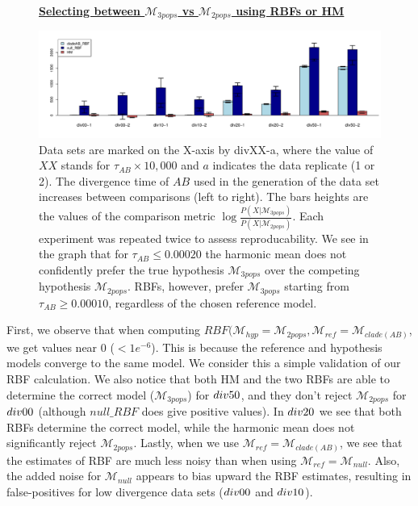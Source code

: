 \documentclass[11pt]{article}
\newcommand{\M}{\mathcal{M}}
\newcommand{\Mref}{\M_{ref}}
\newcommand{\Mhyp}{\M_{hyp}}
\newcommand{\1}{\mathbbm{1}}
\newcommand{\figuretitle}[1]{
	\centering
	\underline{\textbf{#1}}
	\par
	\medskip
}
\begin{document}
\begin{figure}[h]

\figuretitle{Selecting between $\M_{3pops}$ vs $\M_{2pops}$ using RBFs or HM}


\includegraphics[scale=0.4]{results/results-divAB-select}
\captionsetup{width=0.8\textwidth}
\caption{
Data sets are marked on the X-axis by divXX-a, where the value of $XX$ stands for $\tau_{AB} \times 10,000$ and $a$ indicates the data replicate (1 or 2).
%
The divergence time of $AB$ used in the generation of the data set increases between comparisons (left to right).
%
The bars heights are the values of the comparison metric $\log{\frac{P(X|\M_{3pops})}{P(X|\M_{2pops})}}$.
%
Each experiment was repeated twice to assess reproducability. We see in the graph that for $\tau_{AB} \leq 0.00020$ the harmonic mean does not confidently prefer the true hypothesis $\M_{3pops}$ over the competing hypothesis $\M_{2pops}$.
%
RBFs, however, prefer $\M_{3pops}$ starting from $\tau_{AB} \geq 0.00010$, regardless of the chosen reference model.
%
}
\label{fig:results-divAB}
\end{figure}


First, we observe that when computing $RBF(\Mhyp=\M_{2pops}, \Mref=\M_{clade(AB)}$, we get values near 0 ($<1e^{-6}$). This is because the reference and hypothesis models converge to the same model. We consider this a simple validation of our RBF calculation. 
%
We also notice that both HM and the two RBFs are able to determine the correct model ($\M_{3pops}$) for $div\-50$, and they don't reject $\M_{2pops}$ for $div\-00$ (although $null\_RBF$ does give positive values). 
%
In $div\-20$ we see that both RBFs determine the correct model, while the harmonic mean does not significantly reject $\M_{2pops}$.
%
Lastly, when we use $\Mref = \M_{clade(AB)}$, we see that the estimates of RBF are much less noisy than when using $\Mref = \M_{null}$.
%
Also, the added noise for $\M_{null}$ appears to bias upward the RBF estimates, resulting in false-positives for low divergence data sets ($div\-00$ and $div\-10$).
\end{document}

